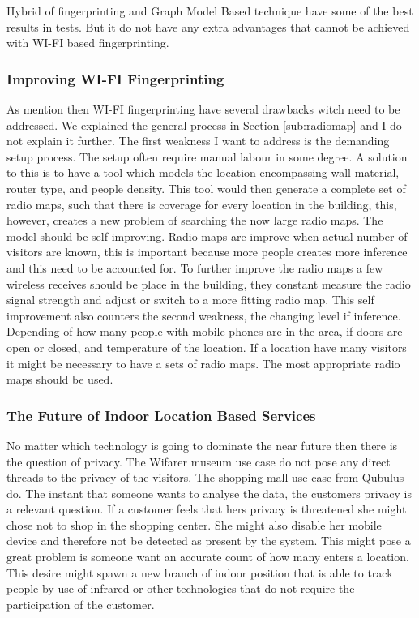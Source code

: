 Hybrid of fingerprinting and Graph Model Based technique have some of the best results in tests. 
But it do not have any extra advantages that cannot be achieved with WI-FI based fingerprinting.

\subsubsection{\qquad Improving WI-FI Fingerprinting} 
As mention then WI-FI fingerprinting have several drawbacks witch need to be addressed.
We explained the general process in Section \ref{sub:radiomap} and I do not explain it further.
The first weakness I want to address is the demanding setup process.
The setup often require manual labour in some degree.
A solution to this is to have a tool which models the location encompassing wall material, router type, and people density. 
This tool would then generate a complete set of radio maps, such that there is coverage for every location in the building, this, however, creates a new problem of searching the now large radio maps. 
The model should be self improving. 
Radio maps are improve when actual number of visitors are known, this is important because more people creates more inference and this need to be accounted for. 
To further improve the radio maps a few wireless receives should be place in the building, they constant measure the radio signal strength and adjust or switch to a more fitting radio map.
This self improvement also counters the second weakness, the changing level if inference.
Depending of how many people with mobile phones are in the area, if doors are open or closed, and temperature of the location.
If a location have many visitors it might be necessary to have a sets of radio maps.
The most appropriate radio maps should be used.

\subsubsection{\qquad The Future of Indoor Location Based Services}
No matter which technology is going to dominate the near future then there is the question of privacy.
The Wifarer museum use case do not pose any direct threads to the privacy of the visitors.
The shopping mall use case from Qubulus do.
The instant that someone wants to analyse the data, the customers privacy is a relevant question.
If a customer feels that hers privacy is threatened she might chose not to shop in the shopping center.
She might also disable her mobile device and therefore not be detected as present by the system.
This might pose a great problem is someone want an accurate count of how many enters a location.
This desire might spawn a new branch of indoor position that is able to track people by use of infrared or other technologies that do not require the participation of the customer.

